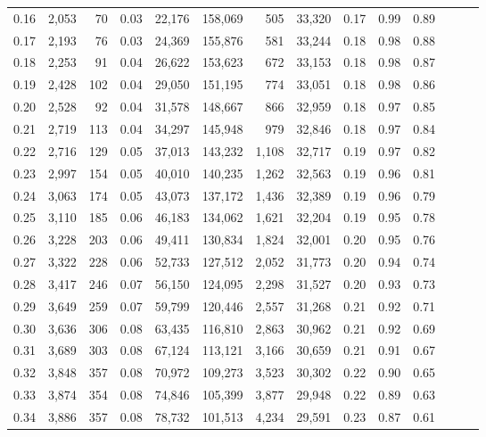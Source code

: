 \begin{tabular}{rrrrrrrrrrrrrr}
0.16 &  2,053 &   70 &  0.03 &   22,176 &  158,069 &     505 &  33,320 &  0.17 &  0.99 &      0.89 \\
0.17 &  2,193 &   76 &  0.03 &   24,369 &  155,876 &     581 &  33,244 &  0.18 &  0.98 &      0.88 \\
0.18 &  2,253 &   91 &  0.04 &   26,622 &  153,623 &     672 &  33,153 &  0.18 &  0.98 &      0.87 \\
0.19 &  2,428 &  102 &  0.04 &   29,050 &  151,195 &     774 &  33,051 &  0.18 &  0.98 &      0.86 \\
0.20 &  2,528 &   92 &  0.04 &   31,578 &  148,667 &     866 &  32,959 &  0.18 &  0.97 &      0.85 \\
0.21 &  2,719 &  113 &  0.04 &   34,297 &  145,948 &     979 &  32,846 &  0.18 &  0.97 &      0.84 \\
0.22 &  2,716 &  129 &  0.05 &   37,013 &  143,232 &   1,108 &  32,717 &  0.19 &  0.97 &      0.82 \\
0.23 &  2,997 &  154 &  0.05 &   40,010 &  140,235 &   1,262 &  32,563 &  0.19 &  0.96 &      0.81 \\
0.24 &  3,063 &  174 &  0.05 &   43,073 &  137,172 &   1,436 &  32,389 &  0.19 &  0.96 &      0.79 \\
0.25 &  3,110 &  185 &  0.06 &   46,183 &  134,062 &   1,621 &  32,204 &  0.19 &  0.95 &      0.78 \\
0.26 &  3,228 &  203 &  0.06 &   49,411 &  130,834 &   1,824 &  32,001 &  0.20 &  0.95 &      0.76 \\
0.27 &  3,322 &  228 &  0.06 &   52,733 &  127,512 &   2,052 &  31,773 &  0.20 &  0.94 &      0.74 \\
0.28 &  3,417 &  246 &  0.07 &   56,150 &  124,095 &   2,298 &  31,527 &  0.20 &  0.93 &      0.73 \\
0.29 &  3,649 &  259 &  0.07 &   59,799 &  120,446 &   2,557 &  31,268 &  0.21 &  0.92 &      0.71 \\
0.30 &  3,636 &  306 &  0.08 &   63,435 &  116,810 &   2,863 &  30,962 &  0.21 &  0.92 &      0.69 \\
0.31 &  3,689 &  303 &  0.08 &   67,124 &  113,121 &   3,166 &  30,659 &  0.21 &  0.91 &      0.67 \\
0.32 &  3,848 &  357 &  0.08 &   70,972 &  109,273 &   3,523 &  30,302 &  0.22 &  0.90 &      0.65 \\
0.33 &  3,874 &  354 &  0.08 &   74,846 &  105,399 &   3,877 &  29,948 &  0.22 &  0.89 &      0.63 \\
0.34 &  3,886 &  357 &  0.08 &   78,732 &  101,513 &   4,234 &  29,591 &  0.23 &  0.87 &      0.61 \\

\end{tabular}
